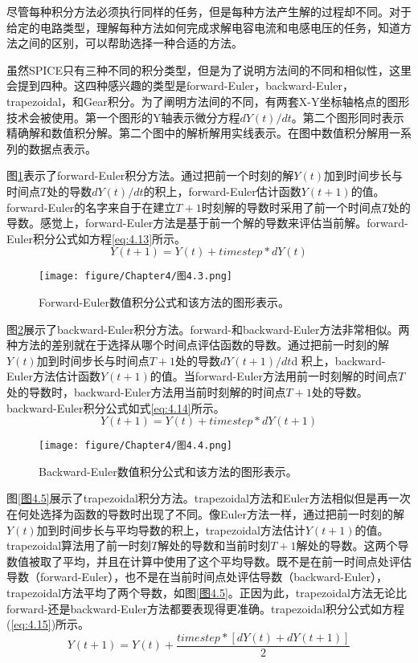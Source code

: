 尽管每种积分方法必须执行同样的任务，但是每种方法产生解的过程却不同。对于给定的电路类型，理解每种方法如何完成求解电容电流和电感电压的任务，知道方法之间的区别，可以帮助选择一种合适的方法。

虽然SPICE只有三种不同的积分类型，但是为了说明方法间的不同和相似性，这里会提到四种。这四种感兴趣的类型是forward-Euler，backward-Euler，trapezoidal，和Gear积分。为了阐明方法间的不同，有两套X-Y坐标轴格点的图形技术会被使用。第一个图形的Y轴表示微分方程$dY(t)/dt$。第二个图形同时表示精确解和数值积分解。第二个图中的解析解用实线表示。在图中数值积分解用一系列的数据点表示。

图\ref{图4.3}表示了forward-Euler积分方法。通过把前一个时刻的解$Y(t)$加到时间步长与时间点$T$处的导数$dY(t)/dt$的积上，forward-Euler估计函数$Y(t+1)$的值。forward-Euler的名字来自于在建立$T+1$时刻解的导数时采用了前一个时间点$T$处的导数。感觉上，forward-Euler方法是基于前一个解的导数来评估当前解。forward-Euler积分公式如方程\ref{eq:4.13}所示。
\begin{equation}
    Y(t+1)=Y(t)+timestep*dY(t)
    \label{eq:4.13}
\end{equation}

\begin{figure}[htbp]
\small
    \centering
    \texttt{[image: figure/Chapter4/图4.3.png]}
    \caption{Forward-Euler数值积分公式和该方法的图形表示。}
    \label{图4.3}
\end{figure}

图\ref{图4.4}展示了backward-Euler积分方法。forward-和backward-Euler方法非常相似。两种方法的差别就在于选择从哪个时间点评估函数的导数。通过把前一时刻的解$Y(t)$加到时间步长与时间点$T+1$处的导数$dY(t+1)/dt$d 积上，backward-Euler方法估计函数$Y(t+1)$的值。当forward-Euler方法用前一时刻解的时间点$T$处的导数时，backward-Euler方法用当前时刻解的时间点$T+1$处的导数。backward-Euler积分公式如式\ref{eq:4.14}所示。
\begin{equation}
    Y(t+1)=Y(t)+timestep*dY(t+1)
\end{equation}

\begin{figure}[htbp]
\small
    \centering
    \texttt{[image: figure/Chapter4/图4.4.png]}
    \caption{Backward-Euler数值积分公式和该方法的图形表示。}
    \label{图4.4}
\end{figure}

图\ref{图4.5}展示了trapezoidal积分方法。trapezoidal方法和Euler方法相似但是再一次在何处选择为函数的导数时出现了不同。像Euler方法一样，通过把前一时刻的解$Y(t)$加到时间步长与平均导数的积上，trapezoidal方法估计$Y(t+1)$的值。trapezoidal算法用了前一时刻$T$解处的导数和当前时刻$T+1$解处的导数。这两个导数值被取了平均，并且在计算中使用了这个平均导数。既不是在前一时间点处评估导数（forward-Euler），也不是在当前时间点处评估导数（backward-Euler），trapezoidal方法平均了两个导数，如图\ref{图4.5}。正因为此，trapezoidal方法无论比forward-还是backward-Euler方法都要表现得更准确。trapezoidal积分公式如方程(\ref{eq:4.15})所示。
\begin{equation}
    Y(t+1)=Y(t)+\frac{timestep*[dY(t)+dY(t+1)]}{2}
    \label{eq:4.15}
\end{equation}

